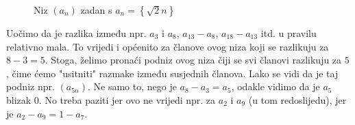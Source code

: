 \begin{figure}[ht]
\begin{center}
\caption{Niz \((a_n)\) zadan s $a_n=\left\{\sqrt{2}n\right\}$}
\label{fig:6.2}
\end{center}
\end{figure}

Uočimo da je razlika između npr. $a_3$ i $a_8$, $a_{13}-a_8$, $a_{18}-a_{13}$ itd. u pravilu relativno mala. To vrijedi i općenito za članove ovog niza koji se razlikuju za $8-3=5$. Stoga, želimo pronaći podniz ovog niza čiji se svi članovi razlikuju za $5$, čime ćemo "usitniti" razmake između susjednih članova. Lako se vidi da je taj podniz npr. $(a_{5n})$. Ne samo to, nego je $a_8-a_3=a_5$, odakle vidimo da je $a_5$ blizak $0$. No treba paziti jer ovo ne vrijedi npr. za $a_2$ i $a_9$ (u tom redoslijedu), jer je $a_2-a_9=1-a_7$.

